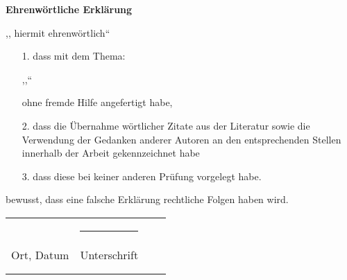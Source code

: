 \thispagestyle{empty}

\begin{center}
	\textbf{\large Ehrenwörtliche Erklärung}
\end{center}
\vspace{0.5cm}

,,\space
hiermit ehrenwörtlich``
\vspace{1cm}
\begin{enumerate}
\item[1.]  
dass \space
\reporttype \space mit dem Thema:

,,\reporttopic``

ohne fremde Hilfe angefertigt habe,

\item[2.] dass\space
{}\space
die Übernahme wörtlicher Zitate aus der Literatur sowie die Verwendung der Gedanken anderer Autoren an den entsprechenden Stellen innerhalb der Arbeit gekennzeichnet habe\space

\item[3.] dass\space
{}\space
diese \reporttype\space bei keiner anderen Prüfung vorgelegt habe.

\end{enumerate}
\vspace{1cm}
\space
bewusst, dass eine falsche Erklärung rechtliche Folgen haben wird.
\vspace{2cm}

\begin{tabular}{p{7cm}lp{7cm}l}
	\rpt{\value{authorcount}}{
		\rule{7cm}{0.4pt} & \rule{7cm}{0.4pt} \\
		Ort, Datum & Unterschrift \\
		\vspace{1cm} & \vspace{1cm}	\\
	}
\end{tabular}
